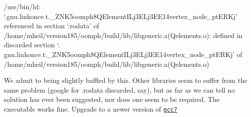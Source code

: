 \begin{DoxyCode}
/usr/bin/ld: `.gnu.linkonce.t.\_ZNK5oomph8QElementILj3ELj3EE14vertex\_node\_ptERKj\textcolor{stringliteral}{' referenced in section
       `.rodata'} of /home/mheil/version185/oomph/build/lib/libgeneric.a(Qelements.o): defined in discarded section `.
      gnu.linkonce.t.\_ZNK5oomph8QElementILj3ELj3EE14vertex\_node\_ptERKj\textcolor{stringliteral}{' of
       /home/mheil/version185/oomph/build/lib/libgeneric.a(Qelements.o)}
\end{DoxyCode}


We admit to being slightly baffled by this. Other libraries seem to suffer from the same problem (google for .{\ttfamily rodata} {\ttfamily discarded}, say), but as far as we can tell no solution has ever been suggested, nor does one seem to be required. The executable works fine. Upgrade to a newer version of \href{http://gcc.gnu.org/}{\tt gcc?}



